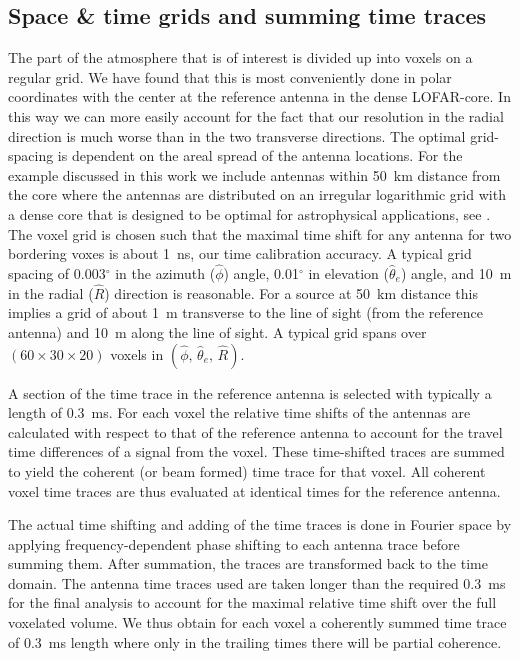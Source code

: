 \subsection{Space \& time grids and summing time traces}

The part of the atmosphere that is of interest is divided up into voxels on a regular grid. We have found that this is most conveniently done in polar coordinates with the center at the reference antenna in the dense LOFAR-core. In this way we can more easily account for the fact that our resolution in the radial direction is much worse than in the two transverse directions. The optimal grid-spacing is dependent on the areal spread of the antenna locations. For the example discussed in this work we include antennas within 50~km distance from the core where the antennas are distributed on an irregular logarithmic grid with a dense core that is designed to be optimal for astrophysical applications, see \cite{Haarlem:2013}. The voxel grid is chosen such that the maximal time shift for any antenna for two bordering voxes is about 1~ns, our time calibration accuracy. A typical grid spacing of 0.003$^\circ$ in the azimuth ($\hat\phi$) angle, 0.01$^\circ$ in elevation ($\hat\theta_e$) angle, and 10~m in the radial ($\hat{R}$) direction is reasonable. For a source at 50~km distance this implies a grid of about 1~m transverse to the line of sight (from the reference antenna) and 10~m along the line of sight. A typical grid spans over $(60 \times 30 \times 20)$ voxels in $(\hat\phi,\,\hat\theta_e,\,\hat{R})$.


A section of the time trace in the reference antenna is selected with typically a length of 0.3~ms. For each voxel the relative time shifts of the antennas are calculated with respect to that of the reference antenna to account for the travel time differences of a signal from the voxel. These time-shifted traces are summed to yield the coherent (or beam formed) time trace for that voxel. All coherent voxel time traces are thus evaluated at identical times for the reference antenna.

The actual time shifting and adding of the time traces is done in Fourier space by applying frequency-dependent phase shifting to each antenna trace before summing them. After summation, the traces are transformed back to the time domain. The antenna time traces used are taken longer than the required 0.3~ms for the final analysis to account for the maximal relative time shift over the full voxelated volume.
We thus obtain for each voxel a coherently summed time trace of 0.3~ms length where only in the trailing times there will be partial coherence.

